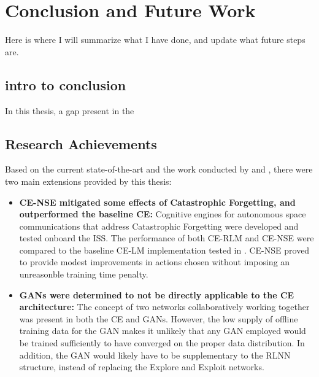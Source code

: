 \chapter{Conclusion and Future Work} \label{ch:conclusion}

\par Here is where I will summarize what I have done, and update what future steps are.
\section{intro to conclusion}
\par In this thesis, a gap present in the 
\section{Research Achievements}
\par Based on the current state-of-the-art and the work conducted by \cite{paulo_theory_paper} and \cite{tim_implementation_paper}, there were two main extensions provided by this thesis:
\begin{itemize}
	\item \textbf{CE-NSE mitigated some effects of Catastrophic Forgetting, and outperformed the baseline CE:} Cognitive engines for autonomous space communications that address Catastrophic Forgetting were developed and tested onboard the ISS. The performance of both CE-RLM and CE-NSE were compared to the baseline CE-LM implementation tested in \cite{tim_implementation_paper}. CE-NSE proved to provide modest improvements in actions chosen without imposing an unreasonble training time penalty.

	\item \textbf{GANs were determined to not be directly applicable to the CE architecture: } The concept of two networks collaboratively working together was present in both the CE and GANs. However, the low supply of offline training data for the GAN makes it unlikely that any GAN employed would be trained sufficiently to have converged on the proper data distribution. In addition, the GAN would likely have to be supplementary to the RLNN structure, instead of replacing the Explore and Exploit networks. 
\end{itemize}

